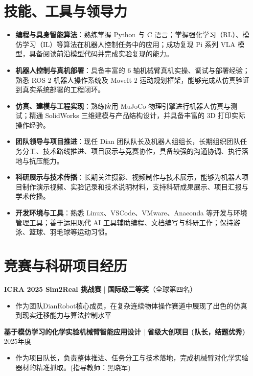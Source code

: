 \documentclass[10pt, a4paper]{ctexart}
\begin{document}
\section{技能、工具与领导力}
\begin{itemize}
    \item \textbf{编程与具身智能算法}：熟练掌握 Python 与 C 语言；掌握强化学习（RL）、模仿学习（IL）等算法在机器人控制任务中的应用；成功复现 Pi 系列 VLA 模型，具备阅读前沿模型代码并完成实验复现的能力。
    \item \textbf{机器人控制与真机部署}：具备丰富的 6 轴机械臂真机实操、调试与部署经验；熟悉 ROS 2 机器人操作系统及 MoveIt 2 运动规划框架，能够完成从仿真验证到真实系统部署的工程闭环。
    \item \textbf{仿真、建模与工程实现}：熟练应用 MuJoCo 物理引擎进行机器人仿真与测试；精通 SolidWorks 三维建模与产品结构设计，并具备丰富的 3D 打印实际操作经验。
    \item \textbf{团队领导与项目推进}：现任 Dian 团队队长及机器人组组长，长期组织团队任务分工、技术路线推进、项目展示与竞赛协作，具备较强的沟通协调、执行落地与抗压能力。
    \item \textbf{科研展示与技术传播}：长期关注摄影、视频制作与技术展示，能够为机器人项目制作演示视频、实验记录和技术说明材料，支持科研成果展示、项目汇报与学术传播。
    \item \textbf{开发环境与工具}：熟悉 Linux、VSCode、VMware、Anaconda 等开发与环境管理工具；善于运用现代 AI 工具辅助编程、文档编写与科研工作；保持游泳、篮球、羽毛球等运动习惯。
\end{itemize}

\section{竞赛与科研项目经历}
\textbf{ICRA 2025 Sim2Real 挑战赛} | \textbf{国际级二等奖}（全球第四名）
\begin{itemize}
    \item 作为团队DianRobot核心成员，在复杂连续物体操作赛道中展现了出色的仿真到现实迁移能力与算法控制水平
\end{itemize}

\vspace{0.2em}
\textbf{基于模仿学习的化学实验机械臂智能应用设计} | \textbf{省级大创项目 (队长，结题优秀)} \hfill 2025年度
\begin{itemize}
    \item 作为项目队长，负责整体推进、任务分工与技术落地，完成机械臂对化学实验器材的精准抓取。(指导教师：黑晓军)
\end{itemize}
\end{document}
